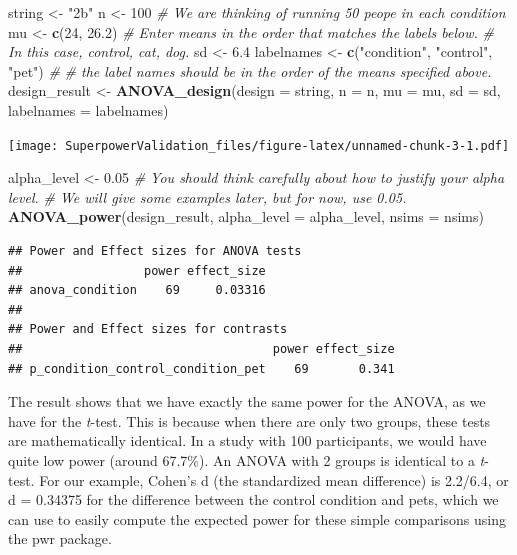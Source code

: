 \documentclass[]{book}
\newenvironment{Shaded}{\begin{snugshade}}{\end{snugshade}}
\newcommand{\CommentTok}[1]{\textcolor[rgb]{0.56,0.35,0.01}{\textit{#1}}}
\newcommand{\DataTypeTok}[1]{\textcolor[rgb]{0.13,0.29,0.53}{#1}}
\newcommand{\DecValTok}[1]{\textcolor[rgb]{0.00,0.00,0.81}{#1}}
\newcommand{\FloatTok}[1]{\textcolor[rgb]{0.00,0.00,0.81}{#1}}
\newcommand{\KeywordTok}[1]{\textcolor[rgb]{0.13,0.29,0.53}{\textbf{#1}}}
\newcommand{\NormalTok}[1]{#1}
\newcommand{\StringTok}[1]{\textcolor[rgb]{0.31,0.60,0.02}{#1}}
\begin{document}
\begin{Shaded}
\begin{Highlighting}[]
\NormalTok{string <-}\StringTok{ "2b"}
\NormalTok{n <-}\StringTok{ }\DecValTok{100}
\CommentTok{# We are thinking of running 50 peope in each condition}
\NormalTok{mu <-}\StringTok{ }\KeywordTok{c}\NormalTok{(}\DecValTok{24}\NormalTok{, }\FloatTok{26.2}\NormalTok{)}
\CommentTok{# Enter means in the order that matches the labels below.}
\CommentTok{# In this case, control, cat, dog. }
\NormalTok{sd <-}\StringTok{ }\FloatTok{6.4}
\NormalTok{labelnames <-}\StringTok{ }\KeywordTok{c}\NormalTok{(}\StringTok{"condition"}\NormalTok{, }\StringTok{"control"}\NormalTok{, }\StringTok{"pet"}\NormalTok{) }\CommentTok{#}
\CommentTok{# the label names should be in the order of the means specified above.}
\NormalTok{design_result <-}\StringTok{ }\KeywordTok{ANOVA_design}\NormalTok{(}\DataTypeTok{design =}\NormalTok{ string,}
                   \DataTypeTok{n =}\NormalTok{ n, }
                   \DataTypeTok{mu =}\NormalTok{ mu, }
                   \DataTypeTok{sd =}\NormalTok{ sd, }
                   \DataTypeTok{labelnames =}\NormalTok{ labelnames)}
\end{Highlighting}
\end{Shaded}

\texttt{[image: SuperpowerValidation\_files/figure-latex/unnamed-chunk-3-1.pdf]}

\begin{Shaded}
\begin{Highlighting}[]
\NormalTok{alpha_level <-}\StringTok{ }\FloatTok{0.05}
\CommentTok{# You should think carefully about how to justify your alpha level.}
\CommentTok{# We will give some examples later, but for now, use 0.05.}
\KeywordTok{ANOVA_power}\NormalTok{(design_result, }\DataTypeTok{alpha_level =}\NormalTok{ alpha_level, }\DataTypeTok{nsims =}\NormalTok{ nsims)}
\end{Highlighting}
\end{Shaded}

\begin{verbatim}
## Power and Effect sizes for ANOVA tests
##                 power effect_size
## anova_condition    69     0.03316
## 
## Power and Effect sizes for contrasts
##                                   power effect_size
## p_condition_control_condition_pet    69       0.341
\end{verbatim}

The result shows that we have exactly the same power for the ANOVA, as we have for the \emph{t}-test. This is because when there are only two groups, these tests are mathematically identical. In a study with 100 participants, we would have quite low power (around 67.7\%). An ANOVA with 2 groups is identical to a \emph{t}-test. For our example, Cohen's d (the standardized mean difference) is 2.2/6.4, or d = 0.34375 for the difference between the control condition and pets, which we can use to easily compute the expected power for these simple comparisons using the pwr package.
\end{document}
